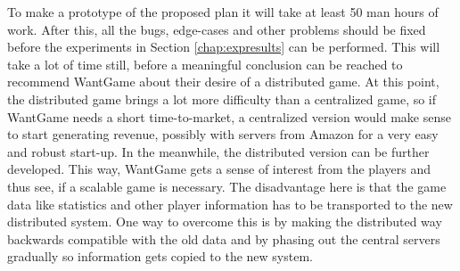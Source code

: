 To make a prototype of the proposed plan it will take at least 50 man hours of work. After this, all the bugs, edge-cases and other problems should be fixed before the experiments in Section \ref{chap:expresults} can be performed. This will take a lot of time still, before a meaningful conclusion can be reached to recommend WantGame about their desire of a distributed game. 
At this point, the distributed game brings a lot more difficulty than a centralized game, so if WantGame needs a short time-to-market, a centralized version would make sense to start generating revenue, possibly with servers from Amazon for a very easy and robust start-up. In the meanwhile, the distributed version can be further developed. This way, WantGame gets a sense of interest from the players and thus see, if a scalable game is necessary. The disadvantage here is that the game data like statistics and other player information has to be transported to the new distributed system. One way to overcome this is by making the distributed way backwards compatible with the old data and by phasing out the central servers gradually so information gets copied to the new system.